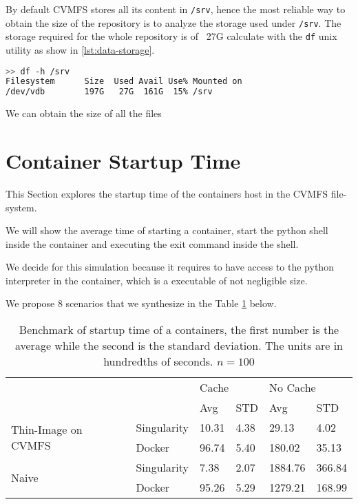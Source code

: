 By default CVMFS stores all its content in \texttt{/srv}, hence the most
reliable way to obtain the size of the repository is to analyze the storage
used under \texttt{/srv}. The storage required for the whole repository is of
~27G calculate with the \texttt{df} unix utility as show in
\ref{lst:data-storage}.

\begin{lstlisting}[language=bash,caption={Storage require to store the whole repository},label={lst:data-storage}]
>> df -h /srv
Filesystem      Size  Used Avail Use% Mounted on
/dev/vdb        197G   27G  161G  15% /srv
\end{lstlisting}

We can obtain the size of all the files 

\section{Container Startup Time}

This Section explores the startup time of the containers host in the CVMFS
file-system.

We will show the average time of starting a container, start the python shell
inside the container and executing the exit command inside the shell.

We decide for this simulation because it requires to have access to  the python
interpreter in the container, which is a executable of not negligible size.

We propose 8 scenarios that we synthesize in the Table \ref{tab:benchmark}
below.


\begin{table}[]
\begin{tabular}{|l|l|l|l|l|l|}
\hline
\multicolumn{2}{|l|}{\multirow{2}{*}{}}            & \multicolumn{2}{l|}{Cache} & \multicolumn{2}{l|}{No Cache} \\ \cline{3-6} 
\multicolumn{2}{|l|}{}                             & Avg          & STD         & Avg            & STD          \\ \hline \hline
\multirow{2}{*}{Thin-Image on CVMFS} & Singularity & 10.31        & 4.38        & 29.13          & 4.02         \\ \cline{2-6} 
                                     & Docker      & 96.74        & 5.40        & 180.02         & 35.13        \\ \hline \hline
\multirow{2}{*}{Naive}               & Singularity & 7.38         & 2.07        & 1884.76        & 366.84       \\ \cline{2-6} 
                                     & Docker      & 95.26        & 5.29        & 1279.21        & 168.99       \\ \hline
\end{tabular}
\caption{Benchmark of startup time of a containers, the first number is the average while the second is the standard deviation. The units are in hundredths of seconds. $n = 100$}
\label{tab:benchmark}
\end{table}


